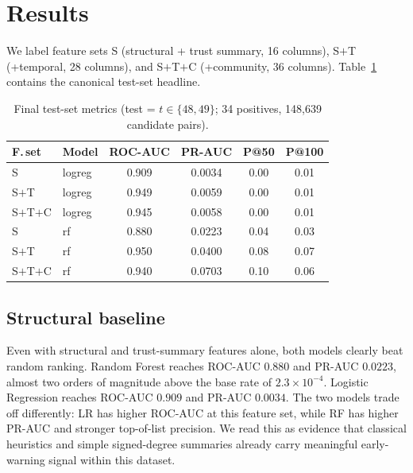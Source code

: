 \documentclass[conference]{IEEEtran}
\begin{document}
\section{Results}\label{sec:results}

We label feature sets S (structural + trust summary, 16 columns),
S$+$T (+temporal, 28 columns), and S$+$T$+$C (+community, 36 columns).
Table~\ref{tab:test_metrics} contains the canonical test-set headline.

\begin{table}[t]
\caption{Final test-set metrics (test = $t \in \{48, 49\}$;
34 positives, 148{,}639 candidate pairs).}
\label{tab:test_metrics}
\centering
\begin{tabular}{llcccc}
\toprule
F.\,set & Model & ROC-AUC & PR-AUC & P@50 & P@100 \\
\midrule
S      & logreg & 0.909 & 0.0034 & 0.00 & 0.01 \\
S$+$T   & logreg & 0.949 & 0.0059 & 0.00 & 0.01 \\
S$+$T$+$C & logreg & 0.945 & 0.0058 & 0.00 & 0.01 \\
\addlinespace
S      & rf     & 0.880 & 0.0223 & 0.04 & 0.03 \\
S$+$T   & rf     & 0.950 & 0.0400 & 0.08 & 0.07 \\
S$+$T$+$C & rf     & 0.940 & 0.0703 & 0.10 & 0.06 \\
\bottomrule
\end{tabular}
\end{table}

\subsection{Structural baseline}
Even with structural and trust-summary features alone, both models
clearly beat random ranking. Random Forest reaches ROC-AUC $0.880$ and
PR-AUC $0.0223$, almost two orders of magnitude above the base rate of
$2.3 \times 10^{-4}$. Logistic Regression reaches ROC-AUC $0.909$ and
PR-AUC $0.0034$. The two models trade off differently: LR has higher
ROC-AUC at this feature set, while RF has higher PR-AUC and stronger
top-of-list precision. We read this as evidence that classical
heuristics and simple signed-degree summaries already carry
meaningful early-warning signal within this dataset.
\end{document}
